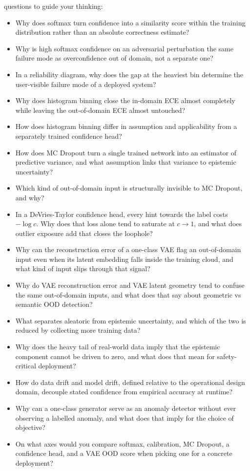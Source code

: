 \fi
{} questions to guide your thinking:
\begin{itemize}
    \item Why does softmax turn confidence into a similarity score within the training distribution rather than an absolute correctness estimate?
    \item Why is high softmax confidence on an adversarial perturbation the same failure mode as overconfidence out of domain, not a separate one?
    \item In a reliability diagram, why does the gap at the heaviest bin determine the user-visible failure mode of a deployed system?
    \item Why does histogram binning close the in-domain ECE almost completely while leaving the out-of-domain ECE almost untouched?
    \item How does histogram binning differ in assumption and applicability from a separately trained confidence head?
    \item How does MC Dropout turn a single trained network into an estimator of predictive variance, and what assumption links that variance to epistemic uncertainty?
    \item Which kind of out-of-domain input is structurally invisible to MC Dropout, and why?
    \item In a DeVries-Taylor confidence head, every hint towards the label costs $-\log c$. Why does that loss alone tend to saturate at $c\!\to\!1$, and what does outlier exposure add that closes the loophole?
    \item Why can the reconstruction error of a one-class VAE flag an out-of-domain input even when its latent embedding falls inside the training cloud, and what kind of input slips through that signal?
    \item Why do VAE reconstruction error and VAE latent geometry tend to confuse the same out-of-domain inputs, and what does that say about geometric vs semantic OOD detection?
    \item What separates aleatoric from epistemic uncertainty, and which of the two is reduced by collecting more training data?
    \item Why does the heavy tail of real-world data imply that the epistemic component cannot be driven to zero, and what does that mean for safety-critical deployment?
    \item How do data drift and model drift, defined relative to the operational design domain, decouple stated confidence from empirical accuracy at runtime?
    \item Why can a one-class generator serve as an anomaly detector without ever observing a labelled anomaly, and what does that imply for the choice of objective?
    \item On what axes would you compare softmax, calibration, MC Dropout, a confidence head, and a VAE OOD score when picking one for a concrete deployment?
\end{itemize}

